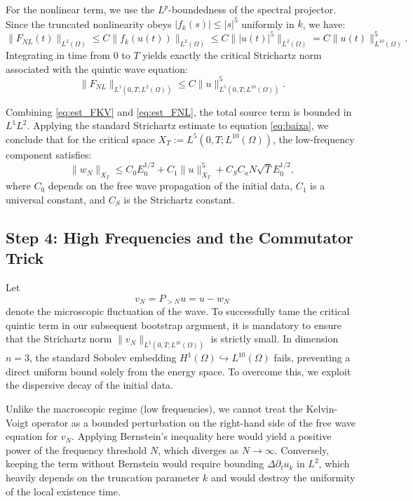 \documentclass[11pt,letterpaper]{amsart}
\begin{document}
For the nonlinear term, we use the $L^p$-boundedness of the spectral projector. Since the truncated nonlinearity obeys $|f_k(s)| \le |s|^5$ uniformly in $k$, we have:
\begin{equation}
    \| F_{NL}(t) \|_{L^2(\Omega)} \le C \| f_k(u(t)) \|_{L^2(\Omega)} \le C \| |u(t)|^5 \|_{L^2(\Omega)} = C \| u(t) \|_{L^{10}(\Omega)}^5.
\end{equation}
Integrating in time from $0$ to $T$ yields exactly the critical Strichartz norm associated with the quintic wave equation:
\begin{equation}\label{eq:est_FNL}
    \| F_{NL} \|_{L^1(0,T; L^2(\Omega))} \le C \| u \|_{L^5(0,T; L^{10}(\Omega))}^5.
\end{equation}

Combining \eqref{eq:est_FKV} and \eqref{eq:est_FNL}, the total source term is bounded in $L^1 L^2$. Applying the standard Strichartz estimate to equation \eqref{eq:baixa}, we conclude that for the critical space $X_T := L^5(0,T; L^{10}(\Omega))$, the low-frequency component satisfies:
\begin{equation}\label{eq:strichartz_baixa}
    \| w_N \|_{X_T} \le C_0 E_0^{1/2} + C_1 \| u \|_{X_T}^5 + C_S C_a N \sqrt{T} E_0^{1/2},
\end{equation}
where $C_0$ depends on the free wave propagation of the initial data, $C_1$ is a universal constant, and $C_S$ is the Strichartz constant.

\subsection{Step 4: High Frequencies and the Commutator Trick}

Let $$v_N = P_{> N} u = u - w_N$$ denote the microscopic fluctuation of the wave. To successfully tame the critical quintic term in our subsequent bootstrap argument, it is mandatory to ensure that the Strichartz norm $\|v_N\|_{L^5(0,T; L^{10}(\Omega))}$ is strictly small. In dimension $n=3$, the standard Sobolev embedding $H^1(\Omega) \hookrightarrow L^{10}(\Omega)$ fails, preventing a direct uniform bound solely from the energy space. To overcome this, we exploit the dispersive decay of the initial data.

Unlike the macroscopic regime (low frequencies), we cannot treat the Kelvin-Voigt operator as a bounded perturbation on the right-hand side of the free wave equation for $v_N$. Applying Bernstein's inequality here would yield a positive power of the frequency threshold $N$, which diverges as $N \to \infty$. Conversely, keeping the term without Bernstein would require bounding $\Delta \partial_t u_k$ in $L^2$, which heavily depends on the truncation parameter $k$ and would destroy the uniformity of the local existence time.
\end{document}
